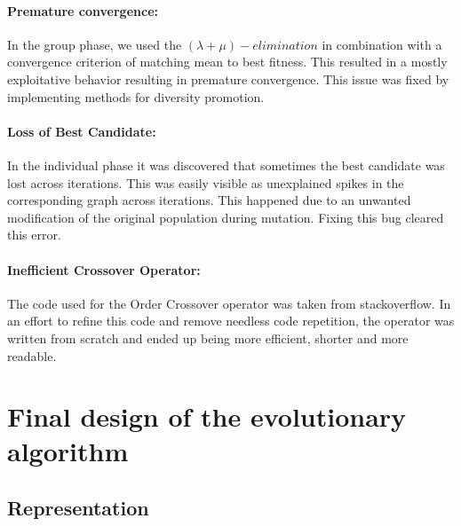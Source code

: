 \documentclass[a4paper,10pt]{article}
\newcommand{\ReplaceMe}[1]{{\color{blue}#1}}
\newcommand{\RemoveMe}[1]{{\color{purple}#1}}
\begin{document}
\paragraph{Premature convergence:} In the group phase, we used the $(\lambda+\mu)-elimination$ in combination with a convergence criterion of matching mean to best fitness. This resulted in a mostly exploitative behavior resulting in premature convergence. This issue was fixed by implementing methods for diversity promotion.

\paragraph{Loss of Best Candidate:} In the individual phase it was discovered that sometimes the best candidate was lost across iterations. This was easily visible as unexplained spikes in the corresponding graph across iterations. This happened due to an unwanted modification of the original population during mutation. Fixing this bug cleared this error.

\paragraph{Inefficient Crossover Operator:} The code used for the Order Crossover operator was taken from stackoverflow. In an effort to refine this code and remove needless code repetition, the operator was written from scratch and ended up being more efficient, shorter and more readable.

\section{Final design of the evolutionary algorithm} 



\subsection{Representation}

\end{document}
